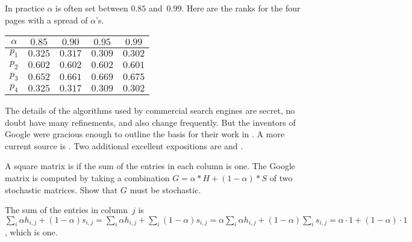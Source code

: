 In practice $\alpha$ is often set between $0.85$ and~$0.99$.
Here are the ranks for the four pages with a spread of
$\alpha$'s.
\begin{center}
  \begin{tabular}{r|cccc}
    \multicolumn{1}{c}{$\alpha$}
          &$0.85$  &$0.90$  &$0.95$ &$0.99$ \\ \hline
    $p_1$ &$0.325$ &$0.317$ &$0.309$  &$0.302$  \\
    $p_2$ &$0.602$ &$0.602$ &$0.602$  &$0.601$  \\
    $p_3$ &$0.652$ &$0.661$ &$0.669$  &$0.675$  \\
    $p_4$ &$0.325$ &$0.317$ &$0.309$  &$0.302$  
  \end{tabular}
\end{center}


\medskip
The details of the algorithms used by commercial search engines are 
secret, no doubt have many refinements, and also change frequently.
But the inventors of Google were gracious enough to outline the basis for 
their work in \cite{BrinPage}.
A more current source is \cite{WikipediaPageRank}.
Two additional excellent expositions are 
\cite{Wills} and
\cite{Austin}.

\begin{exercises}
  \item A square matrix is 
    if the sum of the entries in each column is one.
    The Google matrix is computed by taking a combination
    $G=\alpha*H+(1-\alpha)*S$ of two stochastic matrices.
    Show that $G$ must be stochastic.
    \begin{answer}
      The sum of the entries in column~$j$ is 
      $\sum_i \alpha h_{i,j}+(1-\alpha)s_{i,j}
       =\sum_i \alpha h_{i,j}+\sum_i (1-\alpha)s_{i,j}
       =\alpha\sum_i \alpha h_{i,j} +(1-\alpha)\sum_i s_{i,j}
       =\alpha\cdot 1+(1-\alpha)\cdot 1$,
      which is one.
    \end{answer}
\end{exercises}
\endinput



